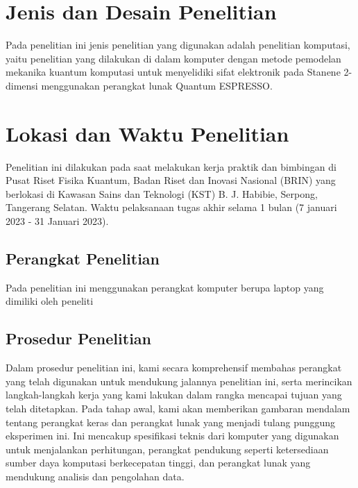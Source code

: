 \section{Jenis dan Desain Penelitian}
Pada penelitian ini jenis penelitian yang digunakan adalah penelitian komputasi, yaitu penelitian yang dilakukan di dalam komputer dengan metode pemodelan mekanika kuantum komputasi untuk menyelidiki sifat elektronik pada Stanene 2-dimensi menggunakan perangkat lunak Quantum ESPRESSO.


\section{Lokasi dan Waktu Penelitian}
Penelitian ini dilakukan pada saat melakukan kerja praktik
dan bimbingan di Pusat Riset Fisika Kuantum, Badan Riset dan
Inovasi Nasional (BRIN) yang berlokasi di Kawasan Sains dan Teknologi (KST) B. J. Habibie, Serpong, Tangerang Selatan. Waktu pelaksanaan tugas akhir selama 1 bulan (7 januari 2023 - 31 Januari 2023). 



\subsection{Perangkat Penelitian}
Pada penelitian ini menggunakan perangkat komputer berupa laptop yang dimiliki oleh peneliti

\subsection{Prosedur Penelitian}
Dalam prosedur penelitian ini, kami secara komprehensif membahas perangkat yang telah digunakan untuk mendukung jalannya penelitian ini, serta merincikan langkah-langkah kerja yang kami lakukan dalam rangka mencapai tujuan yang telah ditetapkan. Pada tahap awal, kami akan memberikan gambaran mendalam tentang perangkat keras dan perangkat lunak yang menjadi tulang punggung eksperimen ini. Ini mencakup spesifikasi teknis dari komputer yang digunakan untuk menjalankan perhitungan, perangkat pendukung seperti ketersediaan sumber daya komputasi berkecepatan tinggi, dan perangkat lunak yang mendukung analisis dan pengolahan data.

